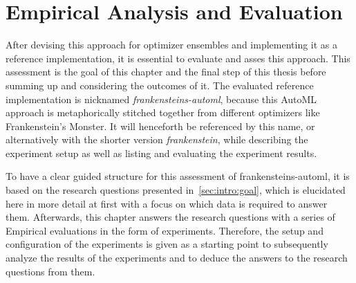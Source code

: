 %
\chapter{Empirical Analysis and Evaluation}
\label{sec:evaluation}
After devising this approach for optimizer ensembles and implementing it as a reference implementation, it is essential to evaluate and asses this approach.
This assessment is the goal of this chapter and the final step of this thesis before summing up and considering the outcomes of it.
The evaluated reference implementation is nicknamed \textit{frankensteins-automl}, because this AutoML approach is metaphorically stitched together from different optimizers like Frankenstein's Monster.
It will henceforth be referenced by this name, or alternatively with the shorter version \textit{frankenstein}, while describing the experiment setup as well as listing and evaluating the experiment results.

To have a clear guided structure for this assessment of frankensteins-automl, it is based on the research questions presented in~\ref{sec:intro:goal}, which is elucidated here in more detail at first with a focus on which data is required to answer them.
Afterwards, this chapter answers the research questions with a series of Empirical evaluations in the form of experiments.\newline
Therefore, the setup and configuration of the experiments is given as a starting point to subsequently analyze the results of the experiments and to deduce the answers to the research questions from them.

